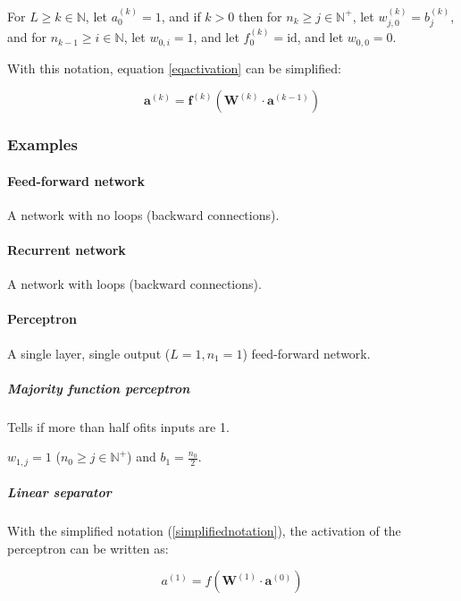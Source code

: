 \documentclass{article}
\begin{document}
        For $L \geq k \in \mathbb{N}$, let $a_0^{(k)} = 1$, and if $k > 0$ then
        for $n_k \geq j \in \mathbb{N}^+$, let $w_{j, 0}^{(k)} = b_{j}^{(k)}$,
        and for $n_{k-1} \geq i \in \mathbb{N}$, let $w_{0,i} = 1$,
        and let $f_0^{(k)} = \text{id}$, and let $w_{0,0}=0$.

        With this notation, equation \ref{eqactivation} can be simplified:

        \begin{equation}\label{eqactivationsimple}
          \mathbf{a}^{(k)} =
            \mathbf{f}^{(k)} \left(
              \mathbf{W}^{(k)} \cdot \mathbf{a}^{(k-1)}
            \right)
        \end{equation}

      \subsubsection{Examples}

        \paragraph{Feed-forward network}

          A network with no loops (backward connections).

        \paragraph{Recurrent network}

          A network with loops (backward connections).

        \paragraph{Perceptron}

          A single layer, single output ($L = 1, n_1 = 1$) feed-forward network.

          \subparagraph{Majority function perceptron}

            Tells if more than half ofits inputs are 1.

            $w_{1,j} = 1$ ($n_0 \geq j \in \mathbb{N}^+$) and
            $b_1 = \frac{n_0}{2}$.

          \subparagraph{Linear separator}
            With the simplified notation (\ref {simplifiednotation}), the
            activation of the perceptron can be written as:

            \begin{equation}
              a^{(1)} = f \left( \mathbf{W}^{(1)} \cdot \mathbf{a}^{(0)} \right)
            \end{equation}
\end{document}
